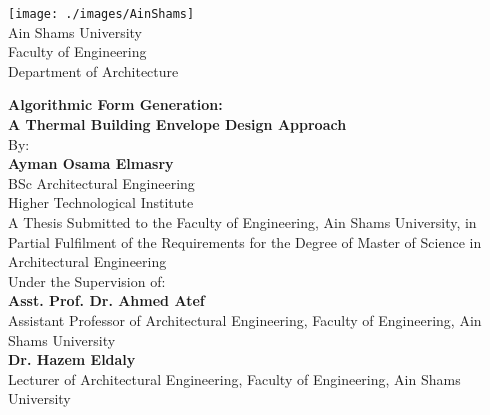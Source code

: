 


\frontmatter

\pagestyle{plain}

\texttt{[image: ./images/AinShams]}\\
\footnotesize
Ain Shams University\\
Faculty of Engineering\\
Department of Architecture\\

\begin{center}
	\Large

\textbf{Algorithmic Form Generation:\\
	A Thermal Building Envelope Design Approach
}\\

\vspace{0.5cm}
\small
By:\\
\normalsize
\textbf{Ayman Osama Elmasry}\\
BSc Architectural Engineering\\
Higher Technological Institute\\
\vspace{0.5cm}
A Thesis Submitted to the Faculty of Engineering, Ain Shams University, in Partial Fulfilment of the Requirements for the Degree of Master of Science in Architectural Engineering\\
\vspace{0.5cm}
Under the Supervision of:\\
\vspace{0.5cm}
\textbf{Asst. Prof. Dr. Ahmed Atef}\\
Assistant Professor of Architectural Engineering, Faculty of Engineering, Ain Shams University\\
\vspace{0.3cm}
\textbf{Dr. Hazem Eldaly}\\
Lecturer of Architectural Engineering, Faculty of Engineering, Ain Shams University

\end{center}

\cleardoublepage
\pagestyle{ruledsmallhd}
\setlength{\parskip}{0.7cm}

